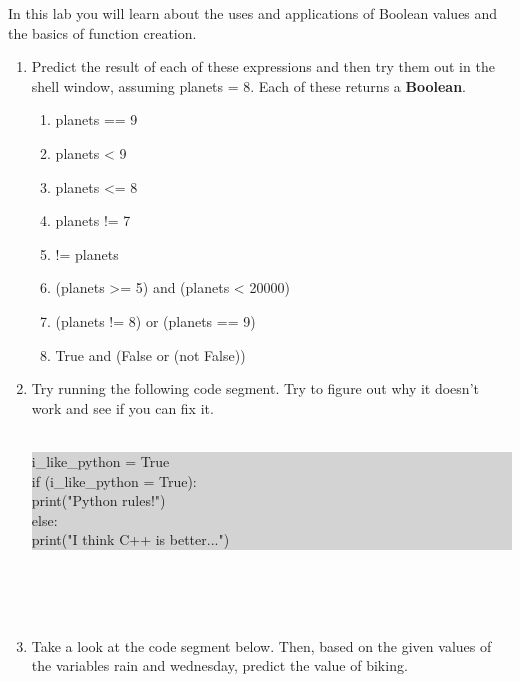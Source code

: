 \documentclass[11pt, letterpaper, onecolumn, oneside, final]{article}
\begin{document}
\maketitle

 In this lab you will learn about the uses and applications of Boolean values and the basics of function creation.
\begin{enumerate}
\item Predict the result of each of these expressions and then try them out in the shell window,
assuming {\consolas planets = 8}. Each of these returns a \textbf{Boolean}.
\begin{enumerate}
    \item {\consolas planets == 9}
    \item {\consolas planets < 9}
    \item {\consolas planets <= 8}
    \item {\consolas planets != 7}
    \item { != planets}
    \item {\consolas (planets >= 5) and (planets < 20000)}
    \item {\consolas (planets != 8) or (planets == 9)}
    \item {\consolas True and (False or (not False))}
\end{enumerate}
\item Try running the following code segment. Try to figure out why it doesn't work and see if you can fix it. \\ \\
    \colorbox{lightgray}{\parbox{.99\textwidth}{\consolas i\_like\_python = True \\ 
    if (i\_like\_python = True): \\
    \hspace*{6mm}print("Python rules!")\\ else: \\
    \hspace*{6mm}print("I think C++ is better...")}}\\\\\\
\item Take a look at the code segment below. Then, based on the given values of the variables {\consolas rain} and {\consolas wednesday}, predict the value of 
{\consolas biking}.\\


\end{enumerate}
\end{document}
